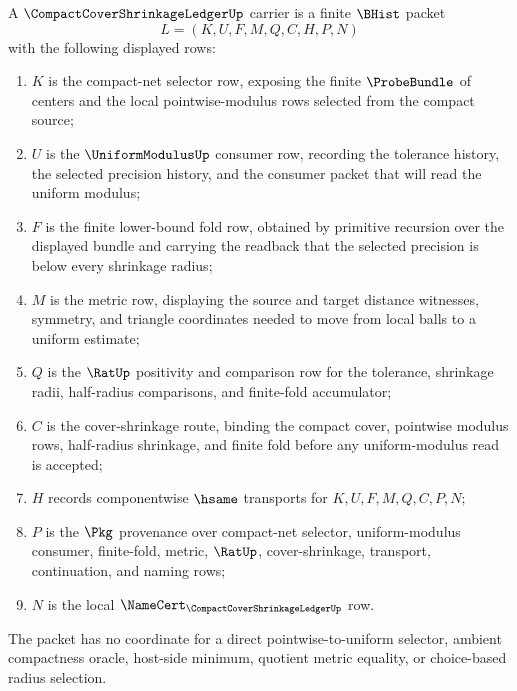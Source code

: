 \begin{definition}
\label{def:compact-cover-shrinkage-ledger-carrier}
A $\CompactCoverShrinkageLedgerUp$ carrier is a finite $\BHist$ packet
$$
L=(K,U,F,M,Q,C,H,P,N)
$$
with the following displayed rows:
\begin{enumerate}
\item $K$ is the compact-net selector row, exposing the finite $\ProbeBundle$ of centers and the local pointwise-modulus rows selected from the compact source;
\item $U$ is the $\UniformModulusUp$ consumer row, recording the tolerance history, the selected precision history, and the consumer packet that will read the uniform modulus;
\item $F$ is the finite lower-bound fold row, obtained by primitive recursion over the displayed bundle and carrying the readback that the selected precision is below every shrinkage radius;
\item $M$ is the metric row, displaying the source and target distance witnesses, symmetry, and triangle coordinates needed to move from local balls to a uniform estimate;
\item $Q$ is the $\RatUp$ positivity and comparison row for the tolerance, shrinkage radii, half-radius comparisons, and finite-fold accumulator;
\item $C$ is the cover-shrinkage route, binding the compact cover, pointwise modulus rows, half-radius shrinkage, and finite fold before any uniform-modulus read is accepted;
\item $H$ records componentwise $\hsame$ transports for $K,U,F,M,Q,C,P,N$;
\item $P$ is the $\Pkg$ provenance over compact-net selector, uniform-modulus consumer, finite-fold, metric, $\RatUp$, cover-shrinkage, transport, continuation, and naming rows;
\item $N$ is the local $\NameCert_{\CompactCoverShrinkageLedgerUp}$ row.
\end{enumerate}
The packet has no coordinate for a direct pointwise-to-uniform selector, ambient compactness oracle, host-side minimum, quotient metric equality, or choice-based radius selection.
\end{definition}


